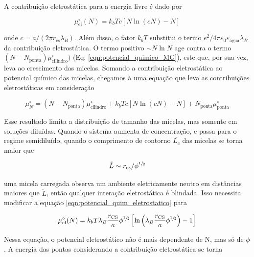		A contribuição eletrostática para a energia livre é dado por
		
		\begin{equation}
			\mu_\mathrm{el}^\circ (N) = k_b T c \left[ N \ln (cN) - N \right]
			\label{eqn:potencial_quim_eletrostatico}
		\end{equation}
		
		\noindent onde \(c = a / (2 \pi r_\mathrm{cs} \lambda_B)\). Além disso, o fator \(k_bT\) substitui o termo \(e^2/4\pi\varepsilon_{ 0 }\varepsilon_\mathrm{água}\lambda_B\) da contribuição eletrostática. O termo positivo \(\sim N \ln N\) age contra o termo \((N - N_\mathrm{ponta}) \mu_\mathrm{cilindro}^\circ)\) (Eq. \ref{eqn:potencial_quimico_MG}), este que, por sua vez, leva ao crescimento das micelas. Somando a contribuição eletrostática ao potencial químico das micelas, chegamos à uma equação que leva as contribuições eletrostáticas em consideração
		
		\begin{equation}
			\mu_N^\circ = (N - N_\mathrm{ponta})\mu_\mathrm{cilindro}^\circ + k_b T c \left[ N \ln (cN) - N \right] + N_\mathrm{ponta}\mu_\mathrm{ponta}^\circ
		\end{equation}
		
		Esse resultado limita a distribuição de tamanho das micelas, mas somente em soluções diluídas. Quando o sistema aumenta de concentração, e passa para o regime semidiluído, quando o comprimento de contorno \(\overline{L_c}\) das micelas se torna maior que
		
		\begin{equation}
		 	\tilde{L} \sim r_\mathrm{cs} / \phi^{\sfrac{1}{2}}
		\end{equation}
		
		\noindent uma micela carregada observa um ambiente eletricamente neutro em distâncias maiores que \(\tilde{L}\), então qualquer interação eletrostática é blindada. Isso necessita modificar a equação \ref{eqn:potencial_quim_eletrostatico} para
		
		\begin{equation}
			\mu_\mathrm{el}^\circ(N) = k_b T \lambda_B \dfrac{r_\mathrm{CS}}{a} \phi^{\sfrac{1}{2}} \left[ \ln \left( \lambda_B \dfrac{r_\mathrm{CS}}{a} \phi^{\sfrac{1}{2}} \right) - 1 \right]
			\label{eqn:potencial_eletrostatico_semidiluido}
		\end{equation}
		
		Nessa equação, o potencial eletrostático não é mais dependente de N, mas só de \(\phi\). A energia das pontas considerando a contribuição eletrostática se torna
		
